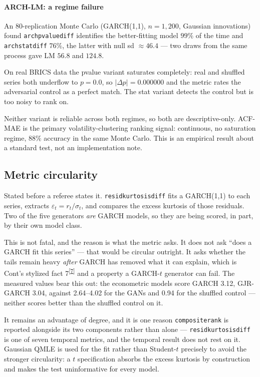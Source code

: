 \documentclass[11pt,a4paper]{article}
\makeatletter
\newcommand{\tcite}[1]{\textsuperscript{[\hyperlink{R:#1}{#1}]}}
\DeclareRobustCommand{\_}{\ifmmode\nfss@text{\textunderscore}\else\textunderscore\allowbreak\fi}
\makeatother
\begin{document}
\paragraph{ARCH-LM: a regime failure} An 80-replication Monte Carlo (GARCH(1,1), $n=1{,}200$, Gaussian innovations) found \texttt{arch\_pvalue\_diff} identifies the better-fitting model $99\%$ of the time and \texttt{arch\_stat\_diff} $76\%$, the latter with null sd $\approx46.4$ --- two draws from the same process gave LM $56.8$ and $124.8$.

On real BRICS data the pvalue variant saturates completely: real and shuffled series both underflow to $p=0.0$, so $|\Delta p| = 0.000000$ and the metric rates the adversarial control as a perfect match. The stat variant detects the control but is too noisy to rank on.

Neither variant is reliable across both regimes, so both are descriptive-only. ACF-MAE is the primary volatility-clustering ranking signal: continuous, no saturation regime, $88\%$ accuracy in the same Monte Carlo. This is an empirical result about a standard test, not an implementation note.

\subsection{Metric circularity}
\label{sec:circularity}
Stated before a referee states it. \texttt{resid\_kurtosis\_diff} fits a GARCH(1,1) to each series, extracts $\varepsilon_t = r_t/\sigma_t$, and compares the excess kurtosis of those residuals. Two of the five generators \emph{are} GARCH models, so they are being scored, in part, by their own model class.

This is not fatal, and the reason is what the metric asks. It does not ask ``does a GARCH fit this series'' --- that would be circular outright. It asks whether the tails remain heavy \emph{after} GARCH has removed what it can explain, which is Cont's stylized fact 7\tcite{7} and a property a GARCH-$t$ generator can fail. The measured values bear this out: the econometric models score GARCH 3.12, GJR-GARCH 3.04, against 2.64--4.02 for the GANs and 0.94 for the shuffled control --- neither scores better than the shuffled control on it.

It remains an advantage of degree, and it is one reason \texttt{composite\_rank} is reported alongside its two components rather than alone --- \texttt{resid\_kurtosis\_diff} is one of seven temporal metrics, and the temporal result does not rest on it. Gaussian QMLE is used for the fit rather than Student-$t$ precisely to avoid the stronger circularity: a $t$ specification absorbs the excess kurtosis by construction and makes the test uninformative for every model.
\end{document}
